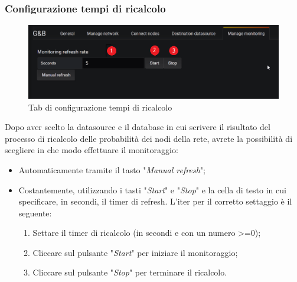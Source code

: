 \subsubsection{Configurazione tempi di ricalcolo}
\begin{figure} [H]
	\centering
	\includegraphics[scale=0.55]{Img/monitoring} 
	\caption{Tab di configurazione tempi di ricalcolo} \label{} 
\end{figure} 
Dopo aver scelto la datasource e il database in cui scrivere il risultato del processo di ricalcolo delle probabilità dei nodi della rete, avrete la possibilità di scegliere in che modo effettuare il monitoraggio:
\begin{itemize}
	\item Automaticamente tramite il tasto "\emph{Manual refresh}";
	\item Costantemente, utilizzando i tasti "\emph{Start}" e "\emph{Stop}" e la cella di testo in cui specificare, in secondi, il timer di refresh. L'iter per il corretto settaggio è il seguente:
		\begin{enumerate}
				\item Settare il timer di ricalcolo (in secondi e con un numero >=0);
				\item Cliccare sul pulsante "\emph{Start}" per iniziare il monitoraggio;
				\item Cliccare sul pulsante "\emph{Stop}" per terminare il ricalcolo.
		\end{enumerate}
\end{itemize}